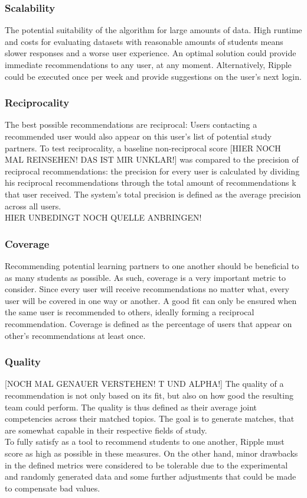 \documentclass[nochapterpage,bigchapter,linedtoc,longdoc,colorback,accentcolor=tud3b]{tudreport}
\begin{document}
\subsubsection{Scalability} The potential suitability of the algorithm for large amounts of data. High runtime and costs for evaluating datasets with reasonable amounts of students means slower responses and a worse user experience. An optimal solution could provide immediate recommendations to any user, at any moment. Alternatively, Ripple could be executed once per week and provide suggestions on the user's next login.\\
\subsubsection{Reciprocality} The best possible recommendations are reciprocal: Users contacting a recommended user would also appear on this user's list of potential study partners. To test reciprocality, a baseline non-reciprocal score [HIER NOCH MAL REINSEHEN! DAS IST MIR UNKLAR!] was compared to the precision of reciprocal recommendations: the precision for every user is calculated by dividing his reciprocal recommendations through the total amount of recommendations k that user received. The system's total precision is defined as the average precision across all users.\\ HIER UNBEDINGT NOCH QUELLE ANBRINGEN!
\subsubsection{Coverage} Recommending potential learning partners to one another should be beneficial to as many students as possible. As such, coverage is a very important metric to consider. Since every user will receive recommendations no matter what, every user will be covered in one way or another. A good fit can only be ensured when the same user is recommended to others, ideally forming a reciprocal recommendation. Coverage is defined as the percentage of users that appear on other's recommendations at least once.\\
\subsubsection{Quality} [NOCH MAL GENAUER VERSTEHEN! T UND ALPHA!] The quality of a recommendation is not only based on its fit, but also on how good the resulting team could perform. The quality is thus defined as their average joint competencies across their matched topics. The goal is to generate matches, that are somewhat capable in their respective fields of study.\\
To fully satisfy as a tool to recommend students to one another, Ripple must score as high as possible in these measures. On the other hand, minor drawbacks in the defined metrics were considered to be tolerable due to the experimental and randomly generated data and some further adjustments that could be made to compensate bad values.\\
\end{document}
